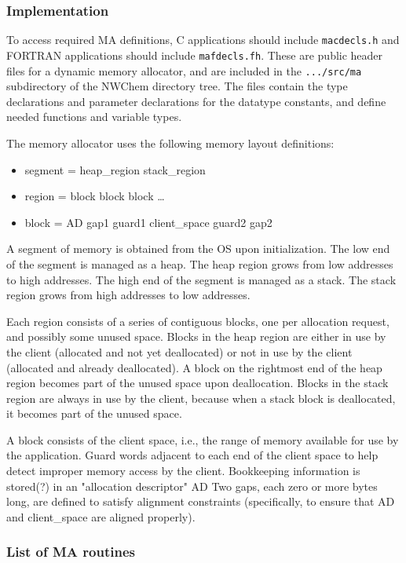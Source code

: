 \subsubsection{Implementation}

To access required MA definitions, C applications should include
{\tt macdecls.h} and FORTRAN applications should include
{\tt mafdecls.fh}.  These are public header files for a dynamic memory 
allocator, and are included in the \verb+.../src/ma+ subdirectory of the
NWChem directory tree.  The files contain the type declarations
and parameter declarations for the datatype constants, and define
needed functions and variable types.

The memory allocator uses the following memory layout definitions:
\begin{itemize}
\item segment = heap\_region stack\_region
\item region = block block block \ldots
\item block = AD gap1 guard1 client\_space guard2 gap2
\end{itemize}

A segment of memory is obtained from the OS upon initialization.  The
low end of the segment is managed as a heap.  The heap region grows
from low addresses to high addresses.  The high end of the segment is
managed as a stack. The stack region grows from high addresses to low
addresses.

Each region consists of a series of contiguous blocks, one per
allocation request, and possibly some unused space.  Blocks in the
heap region are either in use by the client (allocated and not yet
deallocated) or not in use by the client (allocated and already
deallocated).  A block on the rightmost end of the heap region becomes
part of the unused space upon deallocation.  Blocks in the stack
region are always in use by the client, because when a stack block is
deallocated, it becomes part of the unused space.

A block consists of the client space, i.e., the range of memory
available for use by the application.  Guard words adjacent to each end
of the client space to help detect improper memory access by the
client.  Bookkeeping information is stored(?) in an "allocation descriptor" AD
Two gaps, each zero or more bytes long, are defined to satisfy alignment constraints
(specifically, to ensure that AD and client\_space are aligned
properly).  



\subsubsection{List of MA routines}

